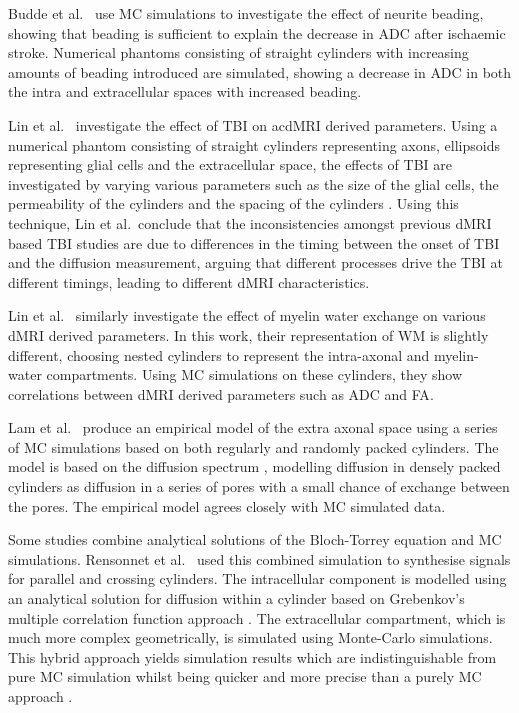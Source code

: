 Budde et al.\ \cite{Budde2010} use \ac{MC} simulations to investigate the effect of neurite beading, showing that beading is sufficient to explain the decrease in \ac{ADC} after ischaemic stroke. Numerical phantoms consisting of straight cylinders with increasing amounts of beading introduced are simulated, showing a decrease in \ac{ADC} in both the intra and extracellular spaces with increased beading. 

Lin et al.\ \cite{Lin2016} investigate the effect of \ac{TBI} on ac{dMRI} derived parameters.
Using a numerical phantom consisting of straight cylinders representing axons, ellipsoids representing glial cells and the extracellular space, the effects of \ac{TBI} are investigated by varying various parameters such as the size of the glial cells, the permeability of the cylinders and the spacing of the cylinders \cite{Lin2016}. 
Using this technique, Lin et al.\ conclude that the inconsistencies amongst previous \ac{dMRI} based \ac{TBI} studies \cite{Huisman2004,Bazarian2007,Rutgers2008} are due to differences in the timing between the onset of \ac{TBI} and the diffusion measurement, arguing that different processes drive the \ac{TBI} at different timings, leading to different \ac{dMRI} characteristics. 

Lin et al.\ \cite{Lin2017} similarly investigate the effect of myelin water exchange on various \ac{dMRI} derived parameters. In this work, their representation of \ac{WM} is slightly different, choosing nested cylinders to represent the intra-axonal and myelin-water compartments.
Using \ac{MC} simulations on these cylinders, they show correlations between \ac{dMRI} derived parameters such as \ac{ADC} and \ac{FA}.

Lam et al.\ \cite{Lam2015} produce an empirical model of the extra axonal space using a series of \ac{MC} simulations based on both regularly and randomly packed cylinders. The model is based on the diffusion spectrum \cite{Stepisnik1993}, modelling diffusion in densely packed cylinders as diffusion in a series of pores with a small chance of exchange between the pores.
The empirical model agrees closely with \ac{MC} simulated data.

Some studies combine analytical solutions of the Bloch-Torrey equation and \ac{MC} simulations.
Rensonnet et al.\ \cite{Rensonnet2015} used this combined simulation to synthesise signals for parallel and crossing cylinders.
The intracellular component is modelled using an analytical solution for diffusion within a cylinder based on Grebenkov's multiple correlation function approach \cite{Grebenkov2008}.
The extracellular compartment, which is much more complex geometrically, is simulated using Monte-Carlo simulations.
This hybrid approach yields simulation results which are indistinguishable from pure \ac{MC} simulation whilst being quicker and more precise than a purely \ac{MC} approach \cite{Rensonnet2015}. 

